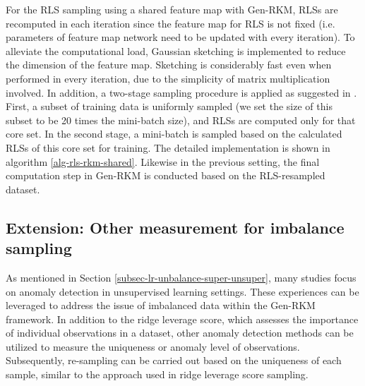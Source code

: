 For the RLS sampling using a shared feature map with Gen-RKM, RLSs are recomputed in each iteration since the feature map for RLS is not fixed (i.e. parameters of feature map network need to be updated with every iteration). To alleviate the computational load, Gaussian sketching is implemented to reduce the dimension of the feature map. Sketching is considerably fast even when performed in every iteration, due to the simplicity of matrix multiplication involved. In addition, a two-stage sampling procedure is applied as suggested in \cite{schreursLeverageScoreSampling2022}. First, a subset of training data is uniformly sampled (we set the size of this subset to be 20 times the mini-batch size), and RLSs are computed only for that core set. In the second stage, a mini-batch is sampled based on the calculated RLSs of this core set for training. The detailed implementation is shown in algorithm \ref{alg-rls-rkm-shared}. Likewise in the previous setting, the final computation step in Gen-RKM is conducted based on the RLS-resampled dataset.


\subsection{Extension: Other measurement for imbalance sampling}
\label{subsec-methods-islation-forest}
As mentioned in Section \ref{subsec-lr-unbalance-super-unsuper}, many studies focus on anomaly detection in unsupervised learning settings. These experiences can be leveraged to address the issue of imbalanced data within the Gen-RKM framework. In addition to the ridge leverage score, which assesses the importance of individual observations in a dataset, other anomaly detection methods can be utilized to measure the uniqueness or anomaly level of observations. Subsequently, re-sampling can be carried out based on the uniqueness of each sample, similar to the approach used in ridge leverage score sampling. 

